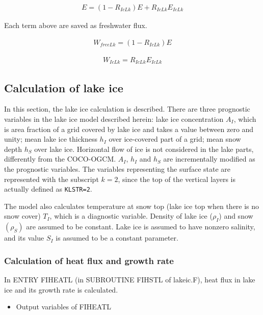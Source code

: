 \begin{eqnarray}
    E=(1-R_{IcLk})E + R_{IcLk}E_{IcLk}
\end{eqnarray}

Each term above are saved as freshwater flux.

\begin{eqnarray}
    W_{freeLk} = (1-R_{IcLk}) E
\end{eqnarray}

\begin{eqnarray}
    W_{IcLk} = R_{IcLk} E_{IcLk}
\end{eqnarray}

\subsection{Calculation of lake ice}\label{calculation-of-lake-ice}

In this section, the lake ice calculation is described. There are three prognostic variables in the lake ice model described herein: lake ice concentration \(A_I\), which is area fraction of a grid
covered by lake ice and takes a value between zero and unity; mean lake ice thickness \(h_I\) over ice-covered part of a grid; mean snow depth \(h_S\) over lake ice. Horizontal flow of ice is not
considered in the lake parts, differently from the COCO-OGCM. \(A_I\), \(h_I\) and \(h_S\) are incrementally modified as the prognostic variables. The variables representing the surface state are
represented with the subscript \(k=2\), since the top of the vertical layers is actually defined as \texttt{KLSTR=2}.

The model also calculates temperature at snow top (lake ice top when there is no snow cover) \(T_I\), which is a diagnostic variable. Density of lake ice (\(\rho_I\)) and snow \((\rho_S)\) are assumed
to be constant. Lake ice is assumed to have nonzero salinity, and its value \(S_I\) is assumed to be a constant parameter.

\subsubsection{Calculation of heat flux and growth rate}\label{calculation-of-heat-flux-and-growth-rate}

In ENTRY FIHEATL (in SUBROUTINE FIHSTL of lakeic.F), heat flux in lake ice and its growth rate is calculated.

\begin{itemize}
\tightlist
\item
  Output variables of FIHEATL
\end{itemize}

